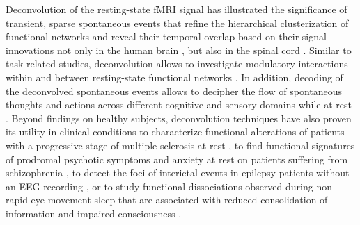 Deconvolution of the resting-state fMRI signal has illustrated the significance
of transient, sparse spontaneous events
\citep{Petridou2013PeriodsrestfMRI,Allan2015FunctionalConnectivityMRI} that
refine the hierarchical clusterization of functional networks
\citep{Karahanoglu2013TotalactivationfMRI} and reveal their temporal overlap
based on their signal innovations not only in the human brain
\citep{Karahanoglu2015Transientbrainactivity}, but also in the spinal cord
\citep{Kinany2020DynamicFunctionalConnectivity}. Similar to task-related
studies, deconvolution allows to investigate modulatory interactions within and
between resting-state functional networks
\citep{Di2013ModulatoryInteractionsResting,Di2015Characterizationsrestingstate}.
In addition, decoding of the deconvolved spontaneous events allows to decipher
the flow of spontaneous thoughts and actions across different cognitive and
sensory domains while at rest
\citep{Karahanoglu2015Transientbrainactivity,GonzalezCastillo2019Imagingspontaneousflow,Tan2017DecodingfMRIevents}.
Beyond findings on healthy subjects, deconvolution techniques have also proven
its utility in clinical conditions to characterize functional alterations of
patients with a progressive stage of multiple sclerosis at rest
\citep{Bommarito2021Alteredanteriordefault}, to find functional signatures of
prodromal psychotic symptoms and anxiety at rest on patients suffering from
schizophrenia \citep{Zoeller2019LargeScaleBrain}, to detect the foci of
interictal events in epilepsy patients without an EEG recording
\citep{Lopes2012Detectionepilepticactivity,Karahanoglu2013Spatialmappinginterictal},
or to study functional dissociations observed during non-rapid eye movement
sleep that are associated with reduced consolidation of information and impaired
consciousness \citep{Tarun2021NREMsleepstages}.

